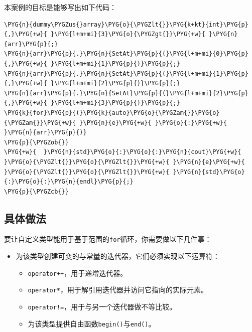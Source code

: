 本案例的目标是能够写出如下代码：



\begin{codeblockbg}
\begin{Verbatim}[commandchars=\\\{\},breaklines=true,breakanywhere=true,fontsize=\codefont,xleftmargin=17bp]
\PYG{n}{dummy\PYGZus{}array}\PYG{o}{\PYGZlt{}}\PYG{k+kt}{int}\PYG{p}{,}\PYG{+w}{ }\PYG{l+m+mi}{3}\PYG{o}{\PYGZgt{}}\PYG{+w}{ }\PYG{n}{arr}\PYG{p}{;}
\PYG{n}{arr}\PYG{p}{.}\PYG{n}{SetAt}\PYG{p}{(}\PYG{l+m+mi}{0}\PYG{p}{,}\PYG{+w}{ }\PYG{l+m+mi}{1}\PYG{p}{)}\PYG{p}{;}
\PYG{n}{arr}\PYG{p}{.}\PYG{n}{SetAt}\PYG{p}{(}\PYG{l+m+mi}{1}\PYG{p}{,}\PYG{+w}{ }\PYG{l+m+mi}{2}\PYG{p}{)}\PYG{p}{;}
\PYG{n}{arr}\PYG{p}{.}\PYG{n}{SetAt}\PYG{p}{(}\PYG{l+m+mi}{2}\PYG{p}{,}\PYG{+w}{ }\PYG{l+m+mi}{3}\PYG{p}{)}\PYG{p}{;}
\PYG{k}{for}\PYG{p}{(}\PYG{k}{auto}\PYG{o}{\PYGZam{}}\PYG{o}{\PYGZam{}}\PYG{+w}{ }\PYG{n}{e}\PYG{+w}{ }\PYG{o}{:}\PYG{+w}{ }\PYG{n}{arr}\PYG{p}{)}
\PYG{p}{\PYGZob{}}
\PYG{+w}{  }\PYG{n}{std}\PYG{o}{:}\PYG{o}{:}\PYG{n}{cout}\PYG{+w}{ }\PYG{o}{\PYGZlt{}}\PYG{o}{\PYGZlt{}}\PYG{+w}{ }\PYG{n}{e}\PYG{+w}{ }\PYG{o}{\PYGZlt{}}\PYG{o}{\PYGZlt{}}\PYG{+w}{ }\PYG{n}{std}\PYG{o}{:}\PYG{o}{:}\PYG{n}{endl}\PYG{p}{;}
\PYG{p}{\PYGZcb{}}
\end{Verbatim}
\end{codeblockbg}



\subsection{具体做法}



要让自定义类型能用于基于范围的\texttt{for}循环，你需要做以下几件事：



\begin{itemize}
\item 为该类型创建可变的与常量的迭代器，它们必须实现以下运算符：



\begin{itemize}
\item \texttt{operator++}，用于递增迭代器。



\item \texttt{operator*}，用于解引用迭代器并访问它指向的实际元素。



\item \texttt{operator!=}，用于与另一个迭代器做不等比较。



\item 为该类型提供自由函数\texttt{begin()}与\texttt{end()}。

\end{itemize}

\end{itemize}


